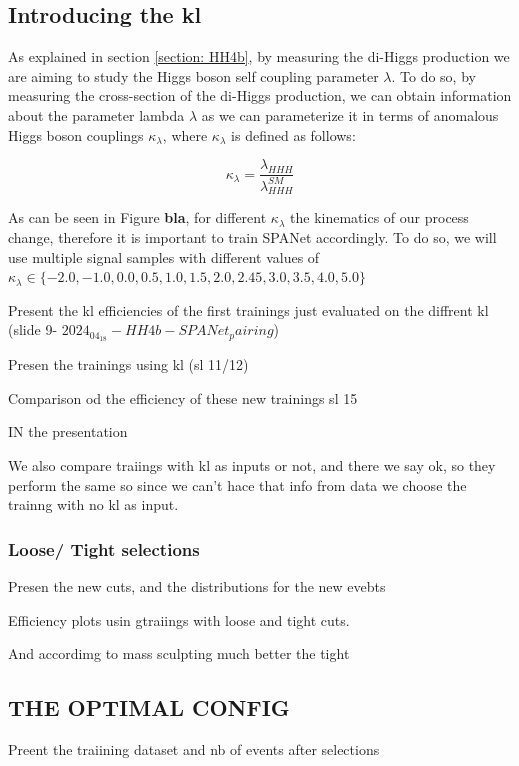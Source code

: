 
\newpage

\subsection{Introducing the kl}

As explained in section \ref{section: HH4b}, by measuring the di-Higgs production we are aiming to study the Higgs boson self coupling parameter $\lambda$. To do so, by measuring the cross-section of the di-Higgs production, we can obtain information about the parameter lambda $\lambda$ as we can parameterize it in terms of anomalous Higgs boson couplings $\kappa_\lambda$, where $\kappa_\lambda$ is defined as follows:

\begin{equation}
    \kappa_\lambda=\frac{\lambda_{HHH}}{\lambda^{SM}_{HHH}}
\end{equation}

As can be seen in Figure \textbf{bla}, for different $\kappa_\lambda$ the kinematics of our process change, therefore it is important to train SPANet accordingly. To do so, we will use multiple signal samples with different values of $\kappa_\lambda \in \{-2.0, -1.0, 0.0, 0.5, 1.0, 1.5, 2.0, 2.45, 3.0, 3.5, 4.0, 5.0\}$

Present the kl efficiencies of the first trainings just evaluated on the diffrent kl (slide 9- $2024_04_18-HH4b-SPANet_pairing$)

Presen the trainings using kl (sl 11/12)

Comparison od the efficiency of these new trainings sl 15


IN the presentation



We also compare traiings with kl as inputs or not, and there we say ok, so they perform the same so since we can't hace that info from data we choose the trainng with no kl as input.

\subsubsection{Loose/ Tight selections}

Presen the new cuts, and the distributions for the new evebts

Efficiency plots usin gtraiings with loose and tight cuts.

And accordimg to mass sculpting much better the tight


\subsection{THE OPTIMAL CONFIG}



Preent the traiining dataset and nb of events after selections